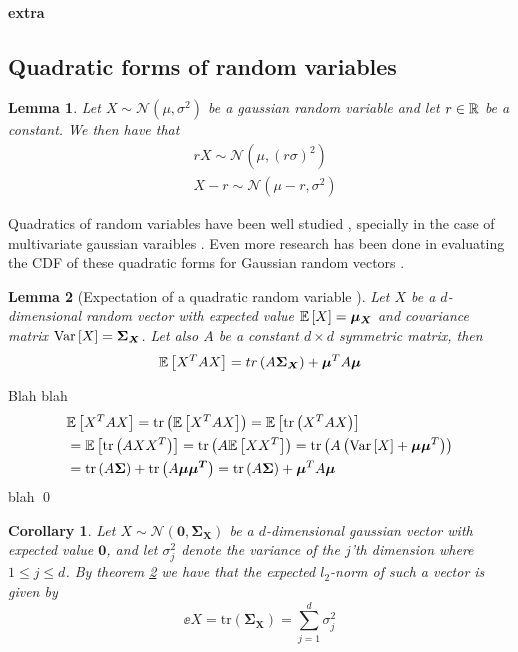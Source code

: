 \documentclass[a4paper,12pt]{article}
\renewenvironment{proof}{{\textit{Proof} \\}}{\qed}
\newtheorem{corollary}{Corollary}[section]
\newtheorem{lemma}{Lemma}[section]
\begin{document}
\paragraph{extra}

\subsection{Quadratic forms of random variables}

\begin{lemma}
\label{lem:GaussTrans}
Let $X \sim \mathcal{N}(\mu, \sigma^2)$ be a gaussian random variable and let $r \in \mathbb{R}$ be a constant.
We then have that
\begin{align*}
    &rX \sim \mathcal{N}(\mu, (r\sigma)^2) \\
    &X - r \sim \mathcal{N}(\mu-r, \sigma^2) 
\end{align*}
    
\end{lemma}

Quadratics of random variables have been well studied \cite{BatesQuadForm,MathaiQaudForms}, 
specially in the case of multivariate gaussian varaibles \cite{IowaQuadNormForms,MathaiQaudForms}.
Even more research has been done in evaluating the CDF of these quadratic forms
for Gaussian random vectors \cite{QuadFormsNume,QaudFormsBounds}.

\begin{lemma}[Expectation of a quadratic random variable \cite{BatesQuadForm}]
\label{lem:ExpQuad}
Let $X$ be a $d$-dimensional random vector with expected value $\mathbb{E} \left [ X  \right] =  \bm{\mu_{X}}$
and covariance matrix $\text{Var} \left [ X  \right] = \bm{\Sigma_{X}}$. Let also $A$ be a constant 
$d \times d$ symmetric matrix, then 
\[
    \mathbb{E} \left [ X^T A X  \right] = tr \left (A \bm{\Sigma_X}\right) + \bm{\mu}^T A\bm{\mu}
\]
\end{lemma}

\begin{proof}
Blah blah
\begin{align*}
    &\mathbb{E} \left [ X^T A X  \right] 
    =\text{tr}\left (\mathbb{E} \left [ X^T A X  \right]\right) 
    =\mathbb{E} \left [ \text{tr} \left (X^T A X\right)  \right] \\
    &= \mathbb{E} \left [ \text{tr} \left (A X X^T\right)  \right]
    = \text{tr} \left (A \mathbb{E} \left [ X X^T  \right]\right) 
    = \text{tr} \left (A \left ( \text{Var} \left [ X  \right] + \bm{\mu} \bm{\mu}^T\right)\right) \\
    &= \text{tr} \left (A \bm{\Sigma}\right) + \text{tr} \left (A \bm{\mu \mu^T}\right)
    = \text{tr} \left (A \bm{\Sigma}\right) + \bm{\mu}^T A \bm{\mu}
\end{align*}
blah
\end{proof}
\begin{corollary}
\label{cor:expNorm}
Let $X \sim \mathcal{N}(\bm{0}, \bm{\Sigma_X})$ be a $d$-dimensional gaussian vector
with expected value $\bm{0}$, and let $\sigma_j^2$ denote the variance of the 
$j$'th dimension where $1 \le j \le d$.
By theorem \ref{lem:ExpQuad} we have that the expected $l_2$-norm 
of such a vector is given by
\[
    \ee{X} = \text{tr} (\bm{\Sigma_X}) = \sum_{j=1}^d \sigma_j^2
\]
\end{corollary}
\end{document}
